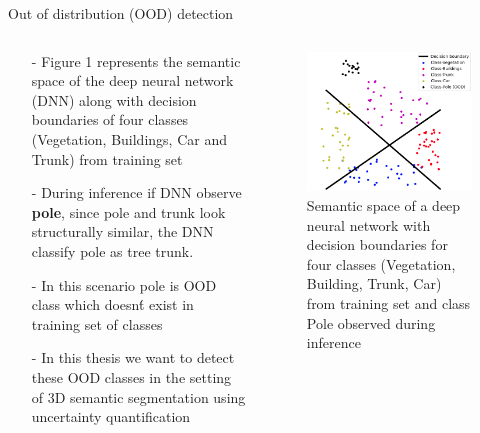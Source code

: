\documentclass[aspectratio=169]{beamer}
\begin{document}
\begin{frame}{Out of distribution (OOD) detection}
    \begin{columns}
        \begin{column}[]{0.6\textwidth}  
            \begin{itemize}
                \item[-] Figure 1 represents the semantic space of the deep neural network (DNN) along with decision boundaries of four classes (Vegetation, Buildings, Car and Trunk) from training set
                \item[-] During inference if DNN observe \textbf{pole}, since pole and trunk look structurally similar, the DNN classify pole as tree trunk.
                \item[-] In this scenario pole is OOD class which doesn\'t exist in  training set of classes
                \item[-] In this thesis we want to detect these OOD classes in the setting of 3D semantic segmentation using uncertainty quantification
            \end{itemize}
        \end{column}
        \begin{column}[]{0.5\textwidth}  
            \begin{figure}[t]
                \includegraphics[scale=0.3]{figures/OOD.png}
                \caption{Semantic space of a deep neural network with decision boundaries for four classes (Vegetation, Building, Trunk, Car) from training set and class Pole observed during inference}
            \end{figure}
        \end{column}
    \end{columns}
\end{frame}
\end{document}
